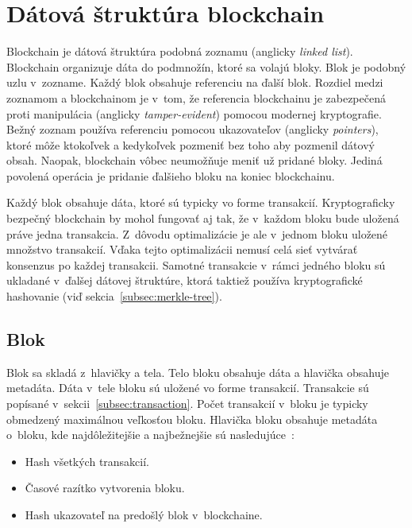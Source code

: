 \section{Dátová štruktúra blockchain}\label{sec:data-struct-blockchain}
Blockchain je dátová štruktúra podobná zoznamu (anglicky \textit{linked list}). Blockchain organizuje dáta do podmnožín, ktoré sa volajú bloky. Blok je podobný uzlu v~zozname. Každý blok obsahuje referenciu na ďalší blok. Rozdiel medzi zoznamom a blockchainom je v~tom, že referencia blockchainu je zabezpečená proti manipulácia (anglicky \textit{tamper-evident}) pomocou modernej kryptografie. Bežný zoznam používa referenciu pomocou ukazovateľov (anglicky \textit{pointers}), ktoré môže ktokoľvek a kedykoľvek pozmeniť bez toho aby pozmenil dátový obsah. Naopak, blockchain vôbec neumožňuje meniť už pridané bloky. Jediná povolená operácia je pridanie ďalšieho bloku na koniec blockchainu.~\cite{horizenAcademy}

Každý blok obsahuje dáta, ktoré sú typicky vo forme transakcií. Kryptograficky bezpečný blockchain by mohol fungovať aj tak, že v~každom bloku bude uložená práve jedna transakcia. Z~dôvodu optimalizácie je ale v~jednom bloku uložené množstvo transakcií. Vďaka tejto optimalizácii nemusí celá sieť vytvárať konsenzus po každej transakcii. Samotné transakcie v~rámci jedného bloku sú ukladané v~ďalšej dátovej štruktúre, ktorá taktiež používa kryptografické hashovanie (viď sekcia~\ref{subsec:merkle-tree}).~\cite{narayanan2016bitcoin}

\subsection{Blok}\label{subsec:block}

Blok sa skladá z~hlavičky a tela. Telo bloku obsahuje dáta a hlavička obsahuje metadáta. Dáta v~tele bloku sú uložené vo forme transakcií. Transakcie sú popísané v~sekcii~\ref{subsec:transaction}. Počet transakcií v~bloku je typicky obmedzený maximálnou veľkosťou bloku.
Hlavička bloku obsahuje metadáta o~bloku, kde najdôležitejšie a najbežnejšie sú nasledujúce~\cite{zhengBlockchainOverview}:
\begin{itemize}
	\item Hash všetkých transakcií.
	\item Časové razítko vytvorenia bloku.
	\item Hash ukazovateľ na predošlý blok v~blockchaine.
\end{itemize} 


